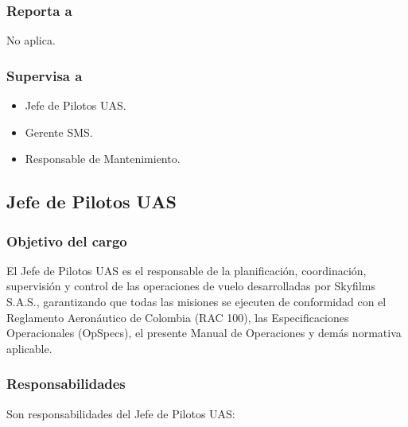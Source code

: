 \subsubsection*{Reporta a}

No aplica.

\subsubsection*{Supervisa a}

\begin{itemize}
\item Jefe de Pilotos UAS.
\item Gerente SMS.
\item Responsable de Mantenimiento.
\end{itemize}



\subsection{Jefe de Pilotos UAS}

\subsubsection*{Objetivo del cargo}

El Jefe de Pilotos UAS es el responsable de la planificación, coordinación, supervisión y control de las operaciones de vuelo desarrolladas por Skyfilms S.A.S., garantizando que todas las misiones se ejecuten de conformidad con el Reglamento Aeronáutico de Colombia (RAC 100), las Especificaciones Operacionales (OpSpecs), el presente Manual de Operaciones y demás normativa aplicable.


\subsubsection*{Responsabilidades}

Son responsabilidades del Jefe de Pilotos UAS:

